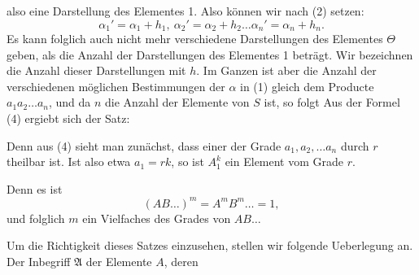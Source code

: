also eine Darstellung des Elementes 1. Also können wir nach (2) setzen:
\[
\alpha_1' = \alpha_1 + h_1,\ \alpha_2' = \alpha_2 + h_2 \ldots \alpha_n' = \alpha_n + h_n.
\]
Es kann folglich auch nicht mehr verschiedene Darstellungen des Elementes $\Theta$ geben, als die Anzahl der Darstellungen des Elementes 1 beträgt. Wir bezeichnen die Anzahl dieser Darstellungen mit $h$. Im Ganzen ist aber die Anzahl der verschiedenen möglichen Bestimmungen der $\alpha$ in (1) gleich dem Producte $a_1 a_2 \ldots a_n$, und da $n$ die Anzahl der Elemente von $S$ ist, so folgt
Aus der Formel (4) ergiebt sich der Satz:


Denn aus (4) sieht man zunächst, dass einer der Grade $a_1, a_2, \ldots a_n$ durch $r$ theilbar ist. Ist also etwa $a_1 = rk$, so ist $A_1^k$ ein Element vom Grade $r$.


Denn es ist
\[
(AB \ldots)^m = A^m B^m \ldots = 1,
\]
und folglich $m$ ein Vielfaches des Grades von $AB \ldots$


Um die Richtigkeit dieses Satzes einzusehen, stellen wir folgende Ueberlegung an. Der Inbegriff $\mathfrak{A}$ der Elemente $A$, deren
